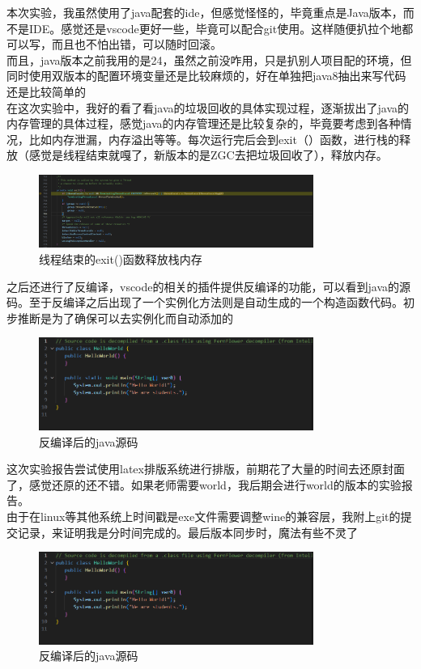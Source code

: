 \documentclass[12pt,a4paper]{article}
\begin{document}
本次实验，我虽然使用了java配套的ide，但感觉怪怪的，毕竟重点是Java版本，而不是IDE。感觉还是vscode更好一些，毕竟可以配合git使用。这样随便扒拉个地都可以写，而且也不怕出错，可以随时回滚。\\
而且，java版本之前我用的是24，虽然之前没咋用，只是扒别人项目配的环境，但同时使用双版本的配置环境变量还是比较麻烦的，好在单独把java8抽出来写代码还是比较简单的\\
在这次实验中，我好的看了看java的垃圾回收的具体实现过程，逐渐拔出了java的内存管理的具体过程，感觉java的内存管理还是比较复杂的，毕竟要考虑到各种情况，比如内存泄漏，内存溢出等等。每次运行完后会到exit（）函数，进行栈的释放（感觉是线程结束就嘎了，新版本的是ZGC去把垃圾回收了），释放内存。\\
    \begin{figure}[H]
    \centering
    \includegraphics[width=0.8\textwidth]{thread.png}
    \caption{线程结束的exit()函数释放栈内存}
    \end{figure}
之后还进行了反编译，vscode的相关的插件提供反编译的功能，可以看到java的源码。至于反编译之后出现了一个实例化方法则是自动生成的一个构造函数代码。初步推断是为了确保可以去实例化而自动添加的
    \begin{figure}[H]
    \centering
    \includegraphics[width=0.8\textwidth]{fanbianyi1.png}
    \caption{反编译后的java源码}
    \end{figure}
这次实验报告尝试使用latex排版系统进行排版，前期花了大量的时间去还原封面了，感觉还原的还不错。如果老师需要world，我后期会进行world的版本的实验报告。\\
由于在linux等其他系统上时间戳是exe文件需要调整wine的兼容层，我附上git的提交记录，来证明我是分时间完成的。最后版本同步时，魔法有些不灵了
    \begin{figure}[H]
    \centering
    \includegraphics[width=0.8\textwidth]{fanbianyi1.png}
    \caption{反编译后的java源码}
    \end{figure}
\end{document}
